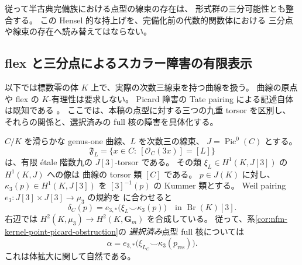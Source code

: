 従って半古典完備族における点型の線束の存在は、
形式群の三分可能性とも整合する。
この Hensel 的な持上げを、完備化前の代数的関数体における
三分点や線束の存在へ読み替えてはならない。

\subsection{flex と三分点によるスカラー障害の有限表示}

以下では標数零の体 $K$ 上で、実際の次数三線束を持つ曲線を扱う。
曲線の原点や flex の $K$-有理性は要求しない。
Picard 障害の Tate pairing による記述自体は既知である
\cite[Theorems~3.1, 3.7]{NFMCiperianiKrashen}。
ここでは、本稿の点型に対する三つの九重 torsor を区別し、
それらの関係と、選択済みの full 核の障害を具体化する。

\begin{proposition}
\label{prop:nfm-kernel-flex-cup}
$C/K$ を滑らかな genus-one 曲線、$L$ を次数三の線束、
$J=\operatorname{Pic}^0(C)$ とする。
\[
 \mathfrak F_L
 =\{x\in C:\ [\mathcal O_C(3x)]=[L]\}
\]
は、有限 \'etale 階数九の $J[3]$-torsor である。
その類 $\xi_L\in H^1(K,J[3])$ の $H^1(K,J)$ への像は
曲線の torsor 類 $[C]$ である。
$p\in J(K)$ に対し、$\kappa_3(p)\in H^1(K,J[3])$ を
$[3]^{-1}(p)$ の Kummer 類とする。
Weil pairing $e_3:J[3]\times J[3]\to\mu_3$ の規約を
\cite[Theorem~3.7]{NFMCiperianiKrashen}に合わせると
\begin{equation}
\label{eq:nfm-kernel-flex-cup}
 \delta_C(p)
   =e_{3,*}\bigl(\xi_L\smile\kappa_3(p)\bigr)
       \quad\text{in }\operatorname{Br}(K)[3].
\end{equation}
右辺では $H^2(K,\mu_3)\to H^2(K,\mathbf G_m)$ を合成している。
従って、系\ref{cor:nfm-kernel-point-picard-obstruction}の
\emph{選択済み}点型 full 核については
\begin{equation}
\label{eq:nfm-point-kernel-finite-cocycle}
 \alpha=e_{3,*}\bigl(\xi_{L_C}\smile
                 \kappa_3(p_{\mathrm{res}})\bigr).
\end{equation}
これは体拡大に関して自然である。
\end{proposition}

